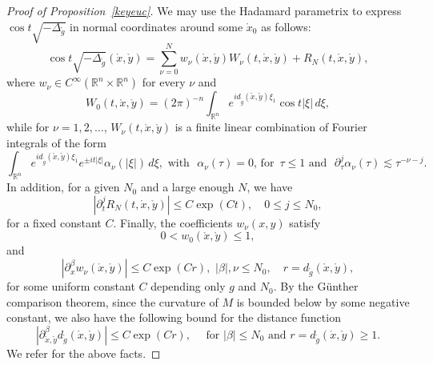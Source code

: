 \documentclass[11pt]{amsart}
\begin{document}
\begin{proof}[Proof of Proposition~\ref{keyeuc}]
We may
use the Hadamard parametrix to express $\cos t\sqrt{-\Delta_{\mathring g}}$  in normal coordinates around some $\mathring x_0$
  as follows:
\begin{equation}\label{ak13}
\cos t\sqrt{-\Delta_{\mathring g}}(\mathring x,
 \mathring y)=
\sum_{\nu=0}^N
w_\nu(\mathring x,\mathring y)W_\nu(t, \mathring x, \mathring y)
+R_N(t, \mathring x, \mathring y),
\end{equation}
where $w_\nu \in C^\infty({\mathbb R}^{n}
\times {\mathbb R}^{n})$ for every $\nu$ and
\begin{equation}\label{k14}
W_0(t, \mathring x, \mathring y)=(2\pi)^{-n}
\int_{{\mathbb R}^{n}} e^{id_{\mathring g}( \mathring x,
  \mathring y)\xi_1} \cos t|\xi| \, d\xi,
\end{equation}
while for $\nu=1,2,\dots$, $W_\nu(t, \mathring x, \mathring y)$
is a finite linear combination of Fourier integrals 
of the form
\begin{equation}\label{k15}
\int_{{\mathbb R}^{n}}
e^{id_{\mathring g}( \mathring x, \mathring y)\xi_1}
e^{\pm it|\xi|}
\alpha_\nu(|\xi|)\, d\xi,
\, \, \text{with } \, \,
\alpha_\nu(\tau)=0, \, \text{for } \, \tau\le 1
\, \, \text{and } \, \, \partial^j_\tau \alpha_\nu(\tau)
\lesssim \tau^{-\nu-j}.
\end{equation}
In addition, for a given $N_0$ and a large enough $N$, we have
\begin{equation}\label{k16}
|\partial_t^j R_N(t, \mathring x, \mathring y)|\le C\exp(Ct),
\quad
0\le j\le N_0,
\end{equation}
for a fixed constant $C$. 
Finally, the coefficients 
$w_\nu( x, y)$ satisfy
\begin{equation}\label{k17}
0<w_0(\mathring x,\mathring y)\le 1,
\end{equation}
and
\begin{equation}\label{k19}
|\partial^\beta_x w_\nu( \mathring x, \mathring y)|
\le C\exp(Cr), \, \,
|\beta|, \nu\le N_0, \quad r=d_{\mathring g}( \mathring x,
 \mathring y),
\end{equation}
for some uniform constant $C$ depending only 
$ g$ and $N_0$. By the G\"unther comparison theorem, since the curvature of $M$ is bounded below by some negative constant, we also have the following bound for the distance function
\begin{equation}\label{k19a}
|\partial^\beta_{\mathring x,\mathring y} d_{\mathring g}( \mathring x,
 \mathring y)|
\le C\exp(Cr), \, \,\, \,\, \,\text{ for }
|\beta|\le N_0 \text{ and }  r=d_{\mathring g}( \mathring x, \mathring y)\geq1.
\end{equation}
We refer \cite[\S 1.1, \S 3.6]{SoggeHangzhou} for the above facts.



\end{proof}
\end{document}

